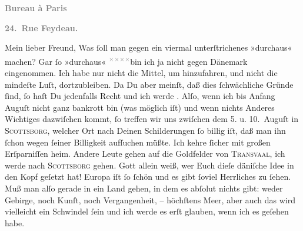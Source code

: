 \pstart
           \begin{otherlanguage}{french}\textcolor{gray}{\textbf{\textbf{Bureau à Paris}}}\end{otherlanguage}\pend
           
\pstart
           \begin{otherlanguage}{french}\textcolor{gray}{\textbf{\textbf{24. Rue Feydeau.}}}\end{otherlanguage}\pend
           
\pstart\center{}Mein lieber Freund,\pend\vspace{0.5em}
\pstart
           Was ſoll man gegen ein viermal unterſtrichenes »durchaus« machen? Gar ſo »durchaus« \substVorne{}\textsuperscript{\textcolor{gray}{×}\-\textcolor{gray}{×}\-\textcolor{gray}{×}\-\textcolor{gray}{×}}\substDazwischen{}bin\substHinten{} ich ja nicht gegen Dänemark
               eingenommen. Ich habe nur nicht die Mittel, um hinzufahren, und nicht die mindeſte
               Luſt, dortzubleiben. Da Du aber meinſt, daß dies ſchwächliche Gründe ſind, ſo haſt Du
               jedenfalls Recht und ich werde \label{K_L02779-1v}\label{K_L02779-1}. Alſo, wenn ich bis Anfang {\pb}Auguſt nicht ganz bankrott bin (was möglich iſt) und wenn
               nichts Anderes Wichtiges dazwiſchen kommt, ſo treffen wir uns zwiſchen dem 5. u. 10. Auguſt in \textsc{Scottsborg}, welcher Ort nach Deinen
               Schilderungen ſo billig iſt, daß man ihn ſchon wegen ſeiner Billigkeit aufſuchen
               müßte. Ich kehre ſicher mit großen Erſparniſſen heim. Andere Leute gehen auf die
               Goldfelder von \textsc{Transvaal}, ich werde nach \textsc{Scottsborg} gehen. Gott allein weiß, wer Euch dieſe däniſche Idee in den Kopf geſetzt hat! {\pb}Europa iſt ſo ſchön und es gibt ſoviel Herrliches
               zu ſehen. Muß man alſo gerade in ein Land gehen, in dem es  abſolut nichts gibt: weder Gebirge, noch Kunſt, noch Vergangenheit, –
               höchſtens Meer, aber auch das wird vielleicht ein Schwindel ſein und ich werde es
               erſt glauben, wenn ich es geſehen habe.\pend
           
